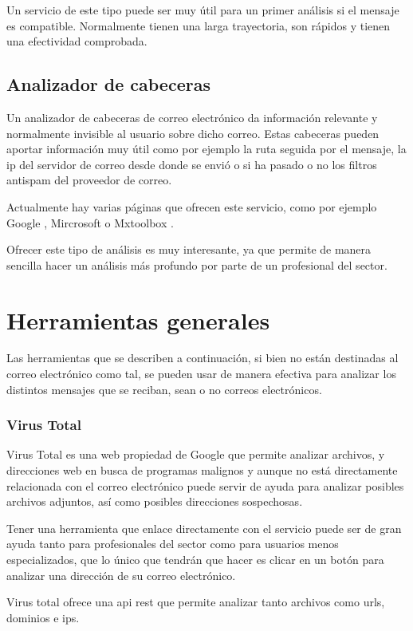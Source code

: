 Un servicio de este tipo puede ser muy útil para un primer análisis si el mensaje es compatible. Normalmente tienen una larga trayectoria, son rápidos y tienen una efectividad comprobada.

\subsection{Analizador de cabeceras}
Un analizador de cabeceras de correo electrónico da información relevante y normalmente invisible al usuario sobre dicho correo. Estas cabeceras pueden aportar información muy útil como por ejemplo la ruta seguida por el mensaje, la ip del servidor de correo desde donde se envió o si ha pasado o no los filtros antispam del proveedor de correo. 

Actualmente hay varias páginas que ofrecen este servicio, como por ejemplo Google \cite{header_google_analyzer}, Mircrosoft \cite{header_microsoft_analyzer} o Mxtoolbox \cite{header_mxtoolbox_analyzer}.

Ofrecer este tipo de análisis es muy interesante, ya que permite de manera sencilla hacer un análisis más profundo por parte de un profesional del sector.

\section{Herramientas generales}
Las herramientas que se describen a continuación, si bien no están destinadas al correo electrónico como tal, se pueden usar de manera efectiva para analizar los distintos mensajes que se reciban, sean o no correos electrónicos. 

\subsubsection{Virus Total} 
Virus Total \cite{virus_total} es una web propiedad de Google que permite analizar archivos, y direcciones web en busca de programas malignos y aunque no está directamente relacionada con el correo electrónico puede servir de ayuda para analizar posibles archivos adjuntos, así como posibles direcciones sospechosas.

Tener una herramienta que enlace directamente con el servicio puede ser de gran ayuda tanto para profesionales del sector como para usuarios menos especializados, que lo único que tendrán que hacer es clicar en un botón para analizar una dirección de su correo electrónico. 

Virus total ofrece una api rest que permite analizar tanto archivos como urls, dominios e ips.\cite{virus_total_api}

